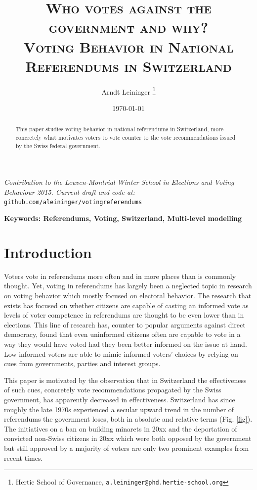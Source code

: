 \documentclass[11pt,a4paper]{article}
\author{Arndt Leininger \thanks{Hertie School of Governance, \texttt{a.leininger@phd.hertie-school.org}}}
\title{\Large{\textsc{Who votes against the government and why?}}\\ \large{\textsc{Voting Behavior in National Referendums in Switzerland}}} %
\date{\today}
\begin{document}
\maketitle

{\small \textit{Contribution to the Leuven-Montréal Winter School in Elections and Voting Behaviour 2015. Current draft and code at:} \texttt{github.com/aleininger/votingreferendums}}



\begin{abstract}
	
	This paper studies voting behavior in national referendums in Switzerland, more concretely what motivates voters to vote counter to the vote recommendations issued by the Swiss federal government.
\end{abstract}	

\small\textbf{Keywords: Referendums, Voting, Switzerland, Multi-level modelling}

\vfill

\newpage

\section{Introduction}\label{sec:introduction}

    Voters vote in referendums more often and in more places than is commonly thought. Yet, voting in referendums has largely been a neglected topic in research on voting behavior which mostly focused on electoral behavior. The research that exists has focused on whether citizens are capable of casting an informed vote as levels of voter competence in referendums are thought to be even lower than in elections. This line of research has, counter to popular arguments against direct democracy, found that even uninformed citizens often are capable to vote in a way they would have voted had they been better informed on the issue at hand. Low-informed  voters are able to mimic informed voters' choices by relying on cues from governments, parties and interest groups.
    
    This paper is motivated by the observation that in Switzerland the effectiveness of such cues, concretely vote recommendations propagated by the Swiss government, has apparently decreased in effectiveness. Switzerland has since roughly the late 1970s experienced a secular upward trend in the number of referendums the government loses, both in absolute and relative terms (Fig. \ref{fig}). The initiatives on a ban on building minarets in 20xx and the deportation of convicted non-Swiss citizens in 20xx which were both opposed by the government but still approved by a majority of voters are only two prominent examples from recent times.
    
\end{document}
